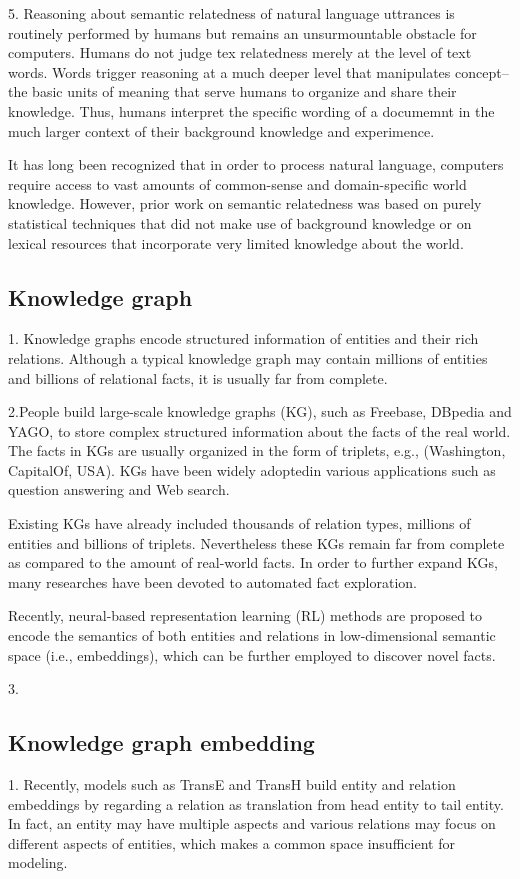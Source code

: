 5. Reasoning about semantic relatedness of natural language uttrances is routinely performed by 
humans but remains an unsurmountable obstacle for computers. Humans do not judge tex relatedness
merely at the level of text words. Words trigger reasoning at a much deeper level that manipulates
concept--the basic units of meaning that serve humans to organize and share their knowledge. Thus, 
humans interpret the specific wording of a documemnt in the much larger context of their background 
knowledge and experimence.

It has long been recognized that in order to process natural language, computers require access to 
vast amounts of common-sense and domain-specific world knowledge. However, prior work on semantic 
relatedness was based on purely statistical techniques that did not make use of background
knowledge or on lexical resources that incorporate very limited knowledge about the world.

\subsection{Knowledge graph} 
1. Knowledge graphs encode structured information of entities and their rich relations.
Although a typical knowledge graph may contain millions of entities and billions of 
relational facts, it is usually far from complete.

2.People build large-scale knowledge graphs (KG), such as Freebase, DBpedia and YAGO, 
to store complex structured information about the facts of the real world. The facts
in KGs are usually organized in the form of triplets, e.g., (Washington, CapitalOf, USA). 
KGs have been widely adoptedin various applications such as question answering and Web search.

Existing KGs have already included thousands of relation
types, millions of entities and billions of triplets. Nevertheless
these KGs remain far from complete as compared to the
amount of real-world facts. In order to further expand KGs,
many researches have been devoted to automated fact exploration.

Recently, neural-based representation learning (RL) methods
are proposed to encode the semantics of both entities
and relations in low-dimensional semantic space (i.e., embeddings),
which can be further employed to discover novel facts.

3. 


\subsection{Knowledge graph embedding}
1. Recently, models such as TransE and TransH build entity and relation embeddings by 
regarding a relation as translation from head entity to tail entity. In fact, an entity
may have multiple aspects and various relations may focus on different aspects of
entities, which makes a common space insufficient for modeling.

